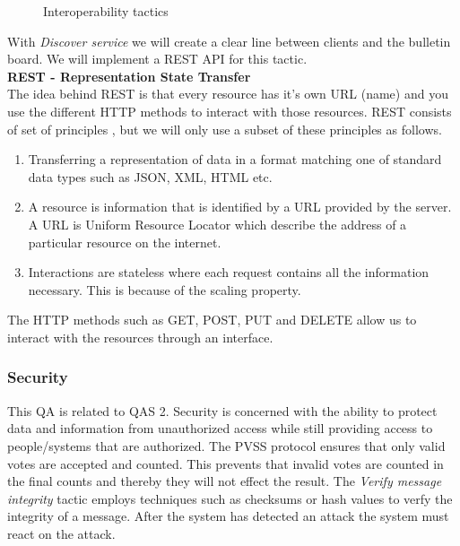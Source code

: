 \begin{figure}[H]
\centering
  \caption{Interoperability tactics \cite{Bass}}   
\end{figure}


\noindent
With \textit{Discover service} we will create a clear line between clients and the bulletin board. We will implement a REST API for this tactic.\\

\noindent
\textbf{REST - Representation State Transfer}\\
The idea behind REST is that every resource has it’s own URL (name) and you use the different HTTP methods to interact with those resources. REST consists of set of principles \cite{Fielding}, but we will only use a subset of these principles as follows.

\begin{enumerate}
    \item Transferring a representation of data in a format matching one of standard data types such as JSON, XML, HTML etc.
    \item A resource is information that is identified by a URL provided by the server. A URL is Uniform Resource Locator which describe the address of a particular resource on the internet.
    \item Interactions are stateless where each request contains all the information necessary. This is because of the scaling property.
\end{enumerate}


\noindent
The HTTP methods such as GET, POST, PUT and DELETE allow us to interact with the resources through an interface.



\noindent
\subsubsection{Security}
This QA is related to QAS 2. Security is concerned with the ability to protect data and information from unauthorized access while still providing access to people/systems that are authorized. The PVSS protocol ensures that only valid votes are accepted and counted. This prevents that invalid votes are counted in the final counts and thereby they will not effect the result. The \textit{Verify message integrity} tactic employs techniques such as checksums or hash values to verfy the integrity of a message. After the system has detected an attack the system must react on the attack.


